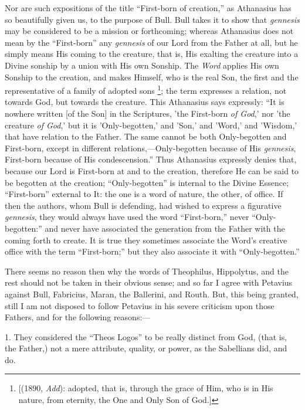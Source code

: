 Nor are such expositions of the title ``First-born of
creation,'' as Athanasius has so beautifully given us, to the
purpose of Bull. Bull takes it to show that \emph{gennesis} may be
considered to be a mission or forthcoming; whereas Athanasius does not
mean by the ``First-born'' any \emph{gennesis} of our Lord
from the Father at all, but he simply means His coming to the
creature, that is, His exalting the creature into a Divine sonship by
a union with His own Sonship. The \emph{Word} applies His own Sonship
to the creation, and makes Himself, who is the real Son, the first and
the representative of a family of adopted sons \footnote{[(1890, \emph{Add}): adopted, that is,
through the grace of Him, who is in His nature, from eternity, the One
and Only Son of God.]}; the term expresses a relation, not towards God, but towards
the creature. This Athanasius says expressly: ``It is nowhere
written [of the Son] in the Scriptures, 'the First-born \emph{of God},'
nor 'the creature \emph{of God},' but it is 'Only-begotten,' and
'Son,' and 'Word,' and 'Wisdom,' that have relation to the Father. The
same cannot be both Only-begotten and First-born, except in different
relations,—Only-begotten because of His \emph{gennesis}, First-born
because of His condescension.'' Thus Athanasius expressly denies
that, because our Lord is First-born at and to the creation, therefore
He can be said to be begotten at the creation;
``Only-begotten'' is internal to the Divine Essence;
``First-born'' external to It: the one is a word of nature,
the other, of office. If then the authors, whom Bull is defending, had
wished to express a figurative \emph{gennesis}, they would always have
used the word ``First-born,'' never ``Only-begotten:''
and never have associated the generation from the Father with the
coming forth to create. It is true they sometimes associate the Word's
creative office with the term ``First-born;'' but they also
associate it with ``Only-begotten.''

There seems no reason then why the words of Theophilus, Hippolytus,
and the rest should not be taken in their obvious sense; and so far I
agree with Petavius against Bull, Fabricius, Maran, the Ballerini, and
Routh. But, this being granted, still I am not disposed to follow
Petavius in his severe criticism upon those Fathers, and for the
following reasons:—

1. They considered the ``Theos Logos'' to be really
distinct from God, (that is, the Father,) not a mere attribute,
quality, or power, as the Sabellians did, and do.

